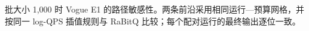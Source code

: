 \begin{table}[tbp]
\centering
\caption[Vogue E1 扫描路径敏感性]{批大小 1,000 时 Vogue E1 的路径敏感性。两条前沿采用相同运行—预算网格，并按同一 log-QPS 插值规则与 RaBitQ 比较；每个配对运行的最终输出逐位一致。}
\label{tab:7-e1-paths}
\small\setlength{\tabcolsep}{5pt}

\end{table}
